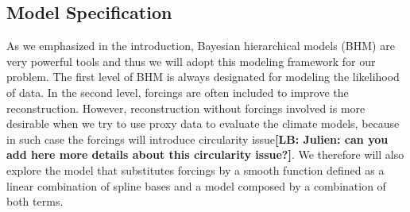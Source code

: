 \documentclass[11pt]{amsart}
\theoremstyle{plain}
\theoremstyle{definition}
\theoremstyle{remark}
\newcommand{\lb}[1]{\color{MidnightBlue}\textbf{[LB: #1]}\normalcolor}
\begin{document}

\subsection{Model Specification}
\label{sec:modelspec}
As we emphasized in the introduction, Bayesian hierarchical models (BHM) are very powerful tools and thus we will adopt this modeling framework for our problem. The first level of BHM is always designated for modeling the likelihood of data. In the second level, forcings are often included to improve
the reconstruction. However, reconstruction without forcings involved is more
desirable when we try to use proxy data to evaluate the climate models, because
in such case the forcings will introduce circularity issue\lb{Julien: can you
  add here more details about this circularity issue?}. We therefore will also
explore the model that substitutes forcings by a smooth function defined as a
linear combination of spline bases and a model composed by a combination of both
terms.
\end{document}
